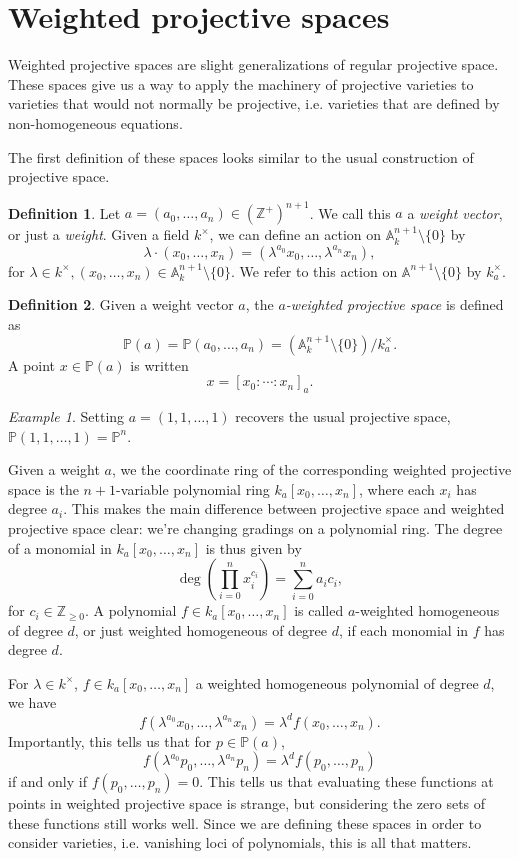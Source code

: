 \documentclass[12pt,twoside]{reedthesis}
\theoremstyle{plain}
\theoremstyle{definition}
\newtheorem{definition}{Definition}[section]
\theoremstyle{remark}
\newtheorem{example}{Example}[section]
\newcommand{\ZZ}{\mathbb{Z}}
\newcommand{\Affine}{\mathbb{A}}
\newcommand{\Proj}{\mathbb{P}}
\begin{document}
\section{Weighted projective spaces}
Weighted projective spaces are slight generalizations of regular projective space. These spaces give us a way to apply the machinery of projective varieties to varieties that would not normally be projective, i.e. varieties that are defined by non-homogeneous equations.

The first definition of these spaces looks similar to the usual construction of projective space.
\begin{definition}
Let $a=(a_0,\ldots,a_n)\in(\ZZ^+)^{n+1}$. We call this $a$ a \emph{weight vector}, or just a \emph{weight}. Given a field $k^\times$, we can define an action on $\Affine^{n+1}_k\setminus\{0\}$ by
\[
\lambda\cdot(x_0,\ldots,x_n)=(\lambda^{a_0}x_0,\ldots,\lambda^{a_n}x_n),
\]
for $\lambda\in k^\times, (x_0,\ldots,x_n)\in\Affine^{n+1}_k\setminus\{0\}$. We refer to this action on $\Affine^{n+1}\setminus\{0\}$ by $k^\times_a$.
\end{definition}
\begin{definition}
Given a weight vector $a$, the \emph{$a$-weighted projective space} is defined as
\[
\Proj(a)=\Proj(a_0,\ldots,a_n)=(\Affine^{n+1}_k\setminus\{0\})/k^\times_a.
\]
A point $x\in\Proj(a)$ is written
\[
x=[x_0:\cdots:x_n]_a.
\]
\end{definition}
\begin{example}
Setting $a=(1,1,\ldots,1)$ recovers the usual projective space, $\Proj(1,1,\ldots,1)=\Proj^n$.
\end{example}
Given a weight $a$, we the coordinate ring of the corresponding weighted projective space is the $n+1$-variable polynomial ring $k_a[x_0,\ldots,x_n]$, where each $x_i$ has degree $a_i$. This makes the main difference between projective space and weighted projective space clear: we're changing gradings on a polynomial ring. The degree of a monomial in $k_a[x_0,\ldots,x_n]$ is thus given by
\[
\deg\left(\prod_{i=0}^n x_i^{c_i}\right)=\sum_{i=0}^n a_ic_i,
\]
for $c_i\in\ZZ_{\geq0}$. A polynomial $f\in k_a[x_0,\ldots,x_n]$ is called $a$-weighted homogeneous of degree $d$, or just weighted homogeneous of degree $d$, if each monomial in $f$ has degree $d$. 

For $\lambda\in k^\times$, $f\in k_a[x_0,\ldots,x_n]$ a weighted homogeneous polynomial of degree $d$, we have
\[
f(\lambda^{a_0}x_0,\ldots,\lambda^{a_n}x_n)=\lambda^d f(x_0,\ldots,x_n).
\]
Importantly, this tells us that for $p\in\Proj(a)$, 
\[
f(\lambda^{a_0}p_0,\ldots,\lambda^{a_n}p_n)=\lambda^d f(p_0,\ldots,p_n)
\]
if and only if $f(p_0,\ldots,p_n)=0$. This tells us that evaluating these functions at points in weighted projective space is strange, but considering the zero sets of these functions still works well. Since we are defining these spaces in order to consider varieties, i.e. vanishing loci of polynomials, this is all that matters.
\end{document}
